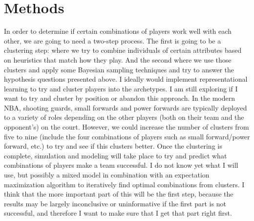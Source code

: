 \documentclass[12pt, letterpaper, titlepage]{article}
\begin{document}
\section{Methods}
In order to determine if certain combinations of players work well with each
other, we are going to need a two-step process.  The first is going to be a
clustering step: where we try to combine individuals of certain attributes based on
heuristics that match how they play.  And the second where we use those clusters
and apply some Bayesian sampling techniques and try to answer the
hypothesis questions presented above.  I ideally would implement representational
learning to try and cluster players into the archetypes.  I am still exploring
if I want to try and cluster by position or abandon this approach.  In the modern
NBA, shooting guards, small forwards and power forwards are typically deployed
to a variety of roles depending on the other players (both on their team and
the opponent's) on the court.  However, we could increase the number of clusters
from five to nine (include the four combinations of players such as small
forward/power forward, etc.) to try and see if this clusters better.  Once the
clustering is complete, simulation and modeling will take place to try and predict
what combinations of players make a team successful.  I do not know yet what I
will use, but possibly a mixed model in combination with an expectation
maximization algorithm to iteratively find optimal combinations from clusters.
I think that the more important part of this will be the first step, because the
results may be largely inconclusive or uninformative if the first part is not
successful, and therefore I want to make sure that I get that part right first.
\end{document}
